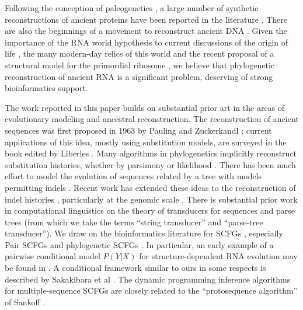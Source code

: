 \documentclass[10pt]{article}
\begin{document}
Following the conception of paleogenetics \cite{PaulingZuckerkandl63},
a large number of synthetic reconstructions of ancient proteins have been
reported in the literature
\cite{MalcolmEtAl90,StackhouseEtAl90,ZhangRosenberg2002,GaucherEtAl2003,ThomsonEtAl2005,ChangEtAl2002,SunEtAl2002,OrtlundEtAl2007}.
There are also the beginnings of a movement to reconstruct ancient DNA
\cite{IvicsEtAl91,AdeyEtAl94,BlanchetteEtAl2004,NoonanEtAl2006,Gaucher2007b,EliasTuller2007,PatenHolmesBirney2008}.
Given the importance of the RNA world hypothesis to
current discussions of the origin of life \cite{MarintchevWagner2004,Muller2005,CavalierSmith2006,WilliamKoonin2006,Forterre2006,Yakhnin2007,DanchinEtAl2007},
the many modern-day relics of this world
 \cite{LeeEtAl93,LoweEddy99,Eddy01,MandalEtAl2003}
and the recent proposal of a structural model for the primordial ribosome
 \cite{SmithEtAl2008},
we believe that phylogenetic reconstruction of ancient RNA is a significant
problem, deserving of strong bioinformatics support.


The work reported in this paper builds on substantial prior art in the areas of evolutionary modeling and ancestral reconstruction.
The reconstruction of ancient sequences was first proposed in 1963 by Pauling and Zuckerkandl \cite{PaulingZuckerkandl63};
current applications of this idea, mostly using substitution models, are surveyed in the book edited by Liberles \cite{Liberles2007}.
Many algorithms in phylogenetics implicitly reconstruct substitution histories,
whether by parsimony \cite{Edwards63,HendyPenny82} or likelihood \cite{Felsenstein81}.
There has been much effort to model the evolution of sequences related
by a tree with models permitting indels
\cite{ThorneEtal91,HeinEtal2000,Hein2001,HolmesBruno2001,SteelHein2001,Holmes2003,KnudsenMiyamoto2003,LunterSongMiklosHein2003,MiklosLunterHolmes2004,LunterEtAl2004,BradleyHolmes2007,SatijaEtAl2008}.
Recent work has extended these ideas to the reconstruction of indel
histories \cite{KimSinha2007,DialloEtAl2007},
particularly at the genomic scale \cite{MillerHausslerEtAl2006,PatenHolmesBirney2008}.
There is substantial prior work in computational linguistics
on the theory of transducers for sequences \cite{MohriPereiraRiley2000}
and parse trees \cite{Rounds70,Thatcher70,GecsegSteinby97,ComonEtAl2007-TreeTransducers}
(from which we take the terms ``string transducer'' and ``parse-tree transducer'').
We draw on the bioinformatics literature for SCFGs
\cite{Eddy94,Sakakibara94c,Durbin98},
especially Pair SCFGs \cite{RivasEddy99,Holmes2005,DowellEddy2006}
and phylogenetic SCFGs \cite{KnudsenHein2003}.
In particular, an early example of a pairwise conditional model $P(Y|X)$ for structure-dependent RNA evolution
may be found in \cite{KleinEddy2003}.
A conditional framework similar to ours in some respects is described
by Sakakibara et al \cite{Sakakibara2003}.
The dynamic programming inference algorithms for multiple-sequence SCFGs are closely related to the ``protosequence algorithm'' of Sankoff \cite{Sankoff85}.
\end{document}
